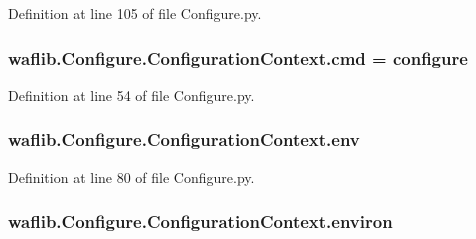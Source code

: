 Definition at line 105 of file Configure.\+py.

\subsubsection[{\texorpdfstring{cmd}{cmd}}]{ waflib.\+Configure.\+Configuration\+Context.\+cmd = \textquotesingle{}configure\textquotesingle{}\hspace{0.3cm}{\ttfamily [static]}}\hypertarget{classwaflib_1_1_configure_1_1_configuration_context_ad472deea600cd9a20fc9fbe6b07bd4f9}{}\label{classwaflib_1_1_configure_1_1_configuration_context_ad472deea600cd9a20fc9fbe6b07bd4f9}


Definition at line 54 of file Configure.\+py.

\subsubsection[{\texorpdfstring{env}{env}}]{\setlength{\rightskip}{0pt plus 5cm}waflib.\+Configure.\+Configuration\+Context.\+env\hspace{0.3cm}{\ttfamily [static]}}\hypertarget{classwaflib_1_1_configure_1_1_configuration_context_a390267f6d3529fe07447ffb4925ca533}{}\label{classwaflib_1_1_configure_1_1_configuration_context_a390267f6d3529fe07447ffb4925ca533}


Definition at line 80 of file Configure.\+py.

\subsubsection[{\texorpdfstring{environ}{environ}}]{\setlength{\rightskip}{0pt plus 5cm}waflib.\+Configure.\+Configuration\+Context.\+environ}\hypertarget{classwaflib_1_1_configure_1_1_configuration_context_a77e99f9b360ecb22608ded3b51418394}{}\label{classwaflib_1_1_configure_1_1_configuration_context_a77e99f9b360ecb22608ded3b51418394}


